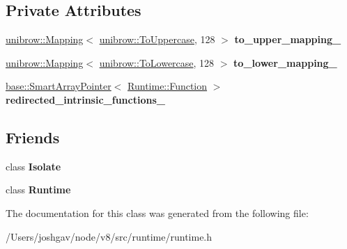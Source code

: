 \subsection*{Private Attributes}
\begin{DoxyCompactItemize}
\item 
\hyperlink{classunibrow_1_1_mapping}{unibrow\+::\+Mapping}$<$ \hyperlink{structunibrow_1_1_to_uppercase}{unibrow\+::\+To\+Uppercase}, 128 $>$ {\bfseries to\+\_\+upper\+\_\+mapping\+\_\+}\hypertarget{classv8_1_1internal_1_1_runtime_state_a31df14139578311cfae033cf351fa3be}{}\label{classv8_1_1internal_1_1_runtime_state_a31df14139578311cfae033cf351fa3be}

\item 
\hyperlink{classunibrow_1_1_mapping}{unibrow\+::\+Mapping}$<$ \hyperlink{structunibrow_1_1_to_lowercase}{unibrow\+::\+To\+Lowercase}, 128 $>$ {\bfseries to\+\_\+lower\+\_\+mapping\+\_\+}\hypertarget{classv8_1_1internal_1_1_runtime_state_a1a2246eae484a21797d253b65f0c7d11}{}\label{classv8_1_1internal_1_1_runtime_state_a1a2246eae484a21797d253b65f0c7d11}

\item 
\hyperlink{classv8_1_1base_1_1_smart_array_pointer}{base\+::\+Smart\+Array\+Pointer}$<$ \hyperlink{structv8_1_1internal_1_1_runtime_1_1_function}{Runtime\+::\+Function} $>$ {\bfseries redirected\+\_\+intrinsic\+\_\+functions\+\_\+}\hypertarget{classv8_1_1internal_1_1_runtime_state_ae0b90b45acd02fde7852f8de885d1d3b}{}\label{classv8_1_1internal_1_1_runtime_state_ae0b90b45acd02fde7852f8de885d1d3b}

\end{DoxyCompactItemize}
\subsection*{Friends}
\begin{DoxyCompactItemize}
\item 
class {\bfseries Isolate}\hypertarget{classv8_1_1internal_1_1_runtime_state_aba4f0964bdacf2bbf62cf876e5d28d0a}{}\label{classv8_1_1internal_1_1_runtime_state_aba4f0964bdacf2bbf62cf876e5d28d0a}

\item 
class {\bfseries Runtime}\hypertarget{classv8_1_1internal_1_1_runtime_state_af3d14e26ba8af9e6cc5a32aad8446de7}{}\label{classv8_1_1internal_1_1_runtime_state_af3d14e26ba8af9e6cc5a32aad8446de7}

\end{DoxyCompactItemize}


The documentation for this class was generated from the following file\+:\begin{DoxyCompactItemize}
\item 
/\+Users/joshgav/node/v8/src/runtime/runtime.\+h\end{DoxyCompactItemize}
